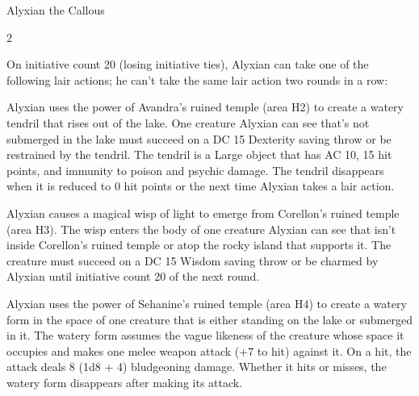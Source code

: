 \documentclass[10pt,a4paper,twoside,bg=none,twocolumn,openany,nodeprecatedcode]{dndbook}
\begin{document}
\begin{DndMonster}[float*=b,width=\textwidth + 8pt]{Alyxian the Callous}
\begin{multicols}{2}
\begin{DndMonsterLegendaryActions}
\end{DndMonsterLegendaryActions}
\par {}
On initiative count 20 (losing initiative ties), Alyxian can take one of the following lair actions; he can't take the same lair action two rounds in a row:


\begin{description}[nolistsep]
\item[Avandra's Grasp]
Alyxian uses the power of Avandra's ruined temple (area H2) to create a watery tendril that rises out of the lake. One creature Alyxian can see that's not submerged in the lake must succeed on a DC 15 Dexterity saving throw or be restrained by the tendril. The tendril is a Large object that has AC 10, 15 hit points, and immunity to poison and psychic damage. The tendril disappears when it is reduced to 0 hit points or the next time Alyxian takes a lair action.

\item[Corellon's Charm]
Alyxian causes a magical wisp of light to emerge from Corellon's ruined temple (area H3). The wisp enters the body of one creature Alyxian can see that isn't inside Corellon's ruined temple or atop the rocky island that supports it. The creature must succeed on a DC 15 Wisdom saving throw or be charmed by Alyxian until initiative count 20 of the next round.

\item[Sehanine's Torment]
Alyxian uses the power of Sehanine's ruined temple (area H4) to create a watery form in the space of one creature that is either standing on the lake or submerged in it. The watery form assumes the vague likeness of the creature whose space it occupies and makes one melee weapon attack (+7 to hit) against it. On a hit, the attack deals 8 (1d8 + 4) bludgeoning damage. Whether it hits or misses, the watery form disappears after making its attack.


\end{description}
\end{multicols}
\end{DndMonster}
\end{document}
